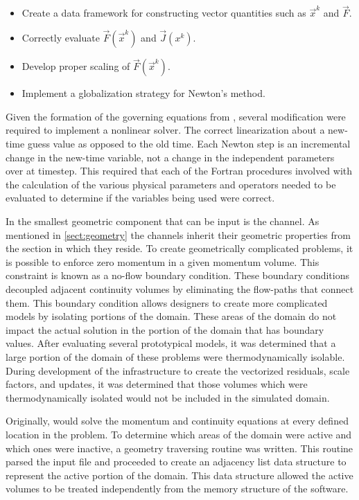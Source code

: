 \begin{itemize}
\item{Create a data framework for constructing vector quantities such as $\vec{x}^{k}$ and $\vec{F}$.}
\item{Correctly evaluate $\vec{F}(\vec{x}^{k})$ and $\vec{J}(x^{k})$.}
\item{Develop proper scaling of $\vec{F}(\vec{x}^{k})$.}
\item{Implement a globalization strategy for Newton's method.}
\end{itemize}

Given the formation of the governing equations from , several modification were required to implement a nonlinear solver.
The correct linearization about a new-time guess value as opposed to the old time.
Each Newton step is an incremental change in the new-time variable, not a change in the independent parameters over at timestep.
This required that each of the Fortran procedures involved with the calculation of the various physical parameters and operators needed to be evaluated to determine if the variables being used were correct.

In \cobra{} the smallest geometric component that can be input is the channel.
As mentioned in \ref{sect:geometry} the channels inherit their geometric properties from the section in which they reside.
To create geometrically complicated problems, it is possible to enforce zero momentum in a given momentum volume.
This constraint is known as a no-flow boundary condition.
These boundary conditions decoupled adjacent continuity volumes by eliminating the flow-paths that connect them.
This boundary condition allows designers to create more complicated models by isolating portions of the domain.
These areas of the domain do not impact the actual solution in the portion of the domain that has boundary values.
After evaluating several prototypical models, it was determined that a large portion of the domain of these problems were thermodynamically isolable.
During development of the infrastructure to create the vectorized residuals, scale factors, and updates, it was determined that those volumes which were thermodynamically isolated would not be included in the simulated domain.


Originally, \cobra{} would solve the momentum and continuity equations at every defined location in the problem.
To determine which areas of the domain were active and which ones were inactive, a geometry traversing routine was written.
This routine parsed the input file and proceeded to create an adjacency list data structure to represent the active portion of the domain.
This data structure allowed the active volumes to be treated independently from the memory structure of the software.

